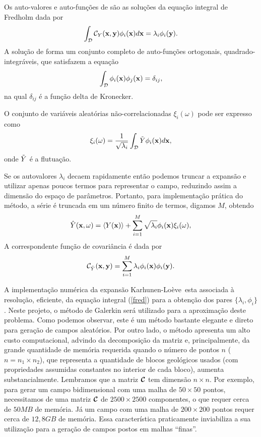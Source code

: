 \documentclass[12pt,a4paper,portuges]{article}
\newcommand{\m}{$M$}
\newcommand{\mm}{M}
\newcommand{\KL}{{Karhunen-Lo\`eve}}
\newcommand{\Y}{{Y}}
\newcommand{\Ym}{\hat{Y}}
\newcommand{\ale}{\omega}
\newcommand{\Dom}{\mathcal{D}}
\newcommand{\ava}{\lambda}
\newcommand{\avai}{\ava_{i}}
\newcommand{\ave}{\phi}
\newcommand{\avei}{\ave_{i}}
\newcommand{\avej}{\ave_{j}}
\begin{document}
Os auto-valores e auto-funções de  são as soluções da equação integral de Fredholm dada
por
%
\begin{equation}
  \int_{\Dom} \covv{\Y} \avei(\vx) d\vx = \avai\avei(\vy).
\label{fred}
\end{equation}
%
\noindent A solução de  forma um conjunto completo de auto-funções ortogonais,
quadrado-integráveis, que satisfazem a equação
%
\begin{equation}
  \int_{\Dom} \avei(\vx) \avej(\vx)=\delta_{ij},
\end{equation}
%
\noindent na qual $\delta_{ij}$ é a função delta de Kronecker.

O conjunto de variáveis aleatórias não-correlacionadas $\xi_{i}(\ale)$ pode ser expresso como
%
\begin{equation}
  \xi_{i}(\ale) = \displaystyle
\frac{1}{\sqrt{\avai}}\int_{\Dom}\flu{\Y}\avei(\vx) d\vx,
\end{equation}
%
\noindent onde $\flu{\Y}$ é a flutuação.

Se os autovalores $\avai$ decaem rapidamente então podemos truncar a expansão  e utilizar
apenas poucos termos para representar o campo, reduzindo assim a dimensão do espaço de
parâmetros. Portanto, para implementação prática do método, a série é truncada em um número finito
de termos, digamos  \m, obtendo
%
\begin{equation}
  \Ym(\vx,\ale) = \med{\Y(\vx)} +\sum_{i=1}^{\mm}\sqrt{\avai} \avei(\vx)
\xi_{i}(\ale),
\label{klM}
\end{equation}
%
A correspondente função de covariância é dada por 
%
\begin{equation}
  \covv{\Ym} = \sum_{i=1}^{\mm} \avai\avei(\vx)\avei(\vy).
\label{klcovM}
\end{equation}
%

A implementação numérica da expansão \KL\ esta associada à resolução, eficiente, da equação integral
(\ref{fred}) para a obtenção dos pares $\{\avai,\avei\}$. Neste projeto, o método de Galerkin será
utilizado para a aproximação deste problema.
Como podemos observar, este é  um método bastante elegante e direto para geração de campos
aleatórios. Por outro lado, o método apresenta um alto custo computacional, advindo da decomposição
da matriz e, principalmente, da grande quantidade de memória requerida quando o número de pontos $n$
($n=n_1\times n_2$), que representa a quantidade de blocos geológicos usados (com propriedades
assumidas constantes no interior de cada bloco),  aumenta substancialmente. Lembramos que a matriz
$\boldsymbol{\mathcal{C}}$ tem dimensão $n\times n$. Por exemplo, para gerar um campo bidimensional com uma malha de
$50\times 50$ pontos, necessitamos de uma matriz $\boldsymbol{\mathcal{C}}$ de $2500\times 2500$ componentes, o que
requer cerca de $50MB$ de memória. Já um campo com uma malha de $200\times 200$ pontos requer cerca
de $12,8GB$ de memória. Essa característica praticamente inviabiliza a sua utilização para a geração
de campos postos em malhas ``finas''.
\end{document}
